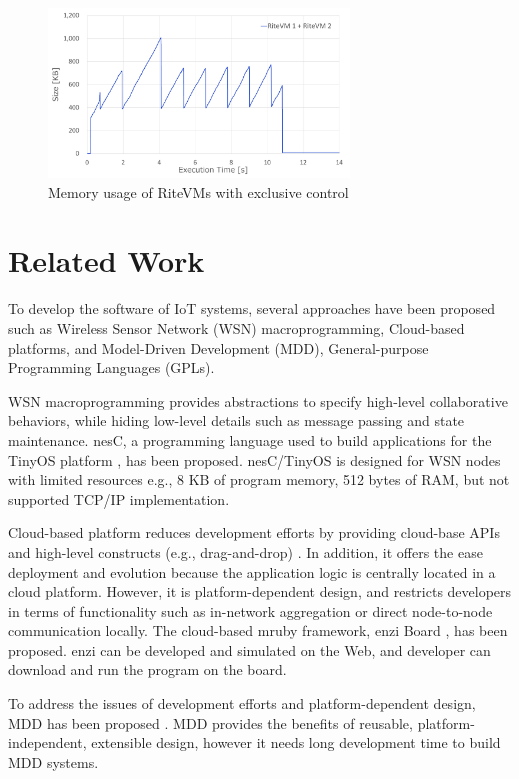 \documentclass[JIP]{ipsj_v2/UTF8/ipsj}
\begin{document}
\begin{figure}[t]
    \centering
    \includegraphics[width=8cm,clip]{figure/EvaluationOfMemoryUsageWithExclusiveContorol.pdf}
    \caption{Memory usage of RiteVMs with exclusive control}
    \label{fig:EvaluationOfMemoryUsageWithExclusiveContorol}
\end{figure}



\section{Related Work}
\label{sec:Related Work}

To develop the software of IoT systems, several approaches have been proposed \cite{par:frameworkCPS} such as Wireless Sensor Network (WSN) macroprogramming, Cloud-based platforms, and Model-Driven Development (MDD), General-purpose Programming Languages (GPLs).

WSN macroprogramming provides abstractions to specify high-level collaborative behaviors, while hiding low-level details such as message passing and state maintenance.
nesC, a programming language used to build applications for the TinyOS platform \cite{par:nesc}, has been proposed.
nesC/TinyOS is designed for WSN nodes with limited resources e.g., 8 KB of program memory, 512 bytes of RAM, but not supported TCP/IP implementation.

Cloud-based platform reduces development efforts by providing cloud-base APIs and high-level constructs (e.g., drag-and-drop) \cite{par:cloud-based}.
In addition, it offers the ease deployment and evolution because the application logic is centrally located in a cloud platform.
However, it is platform-dependent design, and restricts developers in terms of functionality such as in-network aggregation or direct node-to-node communication locally.
The cloud-based mruby framework, enzi Board \cite{url:enzi}, has been proposed.
enzi can be developed and simulated on the Web, and developer can download and run the program on the board.

To address the issues of development efforts and platform-dependent design, MDD has been proposed \cite{par:MDD}.
MDD provides the benefits of reusable, platform-independent, extensible design, however it needs long development time to build MDD systems.
\end{document}
